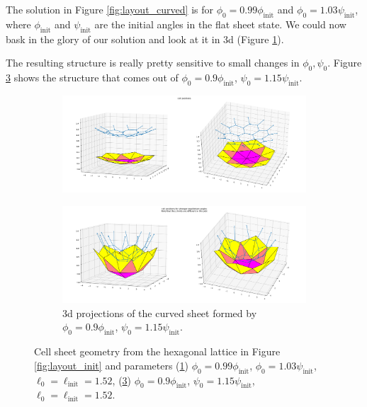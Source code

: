 The solution in Figure \ref{fig:layout_curved} is for $\phi_0 = 0.99 \phi_{\text{init}}$ and $\phi_0 = 1.03 \psi_{\text{init}}$, where $\phi_{\text{init}}$ and $\psi_{\text{init}}$ are the initial angles in the flat sheet state. We could now bask in the glory of our solution and look at it in 3d (Figure \ref{subfig:shallow}).

The resulting structure is really pretty sensitive to small changes in $\phi_0, \psi_0$. Figure \ref{subfig:deep} shows the structure that comes out of $\phi_0 = 0.9 \phi_{\text{init}}$, $\psi_0 = 1.15\psi_{\text{init}}$. 

\begin{figure}[htbp]
    \centering
    \begin{subfigure}[b]{\textwidth}
        \centering 
        \includegraphics[width=\textwidth]{shallow.png}
        \caption{}
        \label{subfig:shallow}
    \end{subfigure}
    \begin{subfigure}[b]{\textwidth}
        \centering
        \includegraphics[width=\textwidth]{deep.png}
        \caption{3d projections of the curved sheet formed by $\phi_0 = 0.9 \phi_{\text{init}}$, $\psi_0 = 1.15\psi_{\text{init}}$. }
        \label{subfig:deep}
    \end{subfigure}
    \caption{Cell sheet geometry from the hexagonal lattice in Figure \ref{fig:layout_init} and parameters (\ref{subfig:shallow}) $\phi_0 = 0.99 \phi_{\text{init}}$, $\phi_0 = 1.03 \psi_{\text{init}}$, $\ell_0 = \ell_{\text{init}}=1.52$, (\ref{subfig:deep}) $\phi_0 = 0.9 \phi_{\text{init}}$, $\psi_0 = 1.15\psi_{\text{init}}$, $\ell_0 = \ell_{\text{init}}=1.52$. }
\end{figure}

